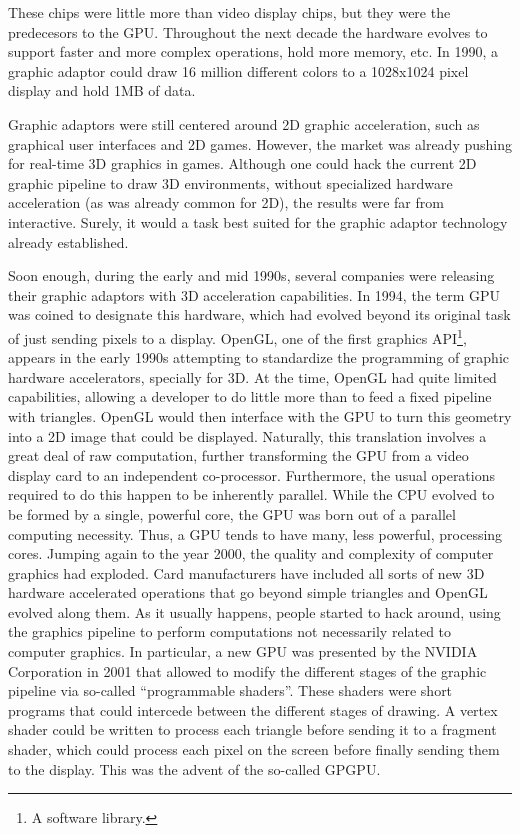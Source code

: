 \documentclass[ twoside,openright,titlepage,numbers=noenddot,%
headinclude,footinclude,cleardoublepage=empty,abstract=on,
BCOR=5mm,paper=a4,fontsize=11pt, dvipsnames
]{scrreprt}
\newcommand{\gpu}{\gls{GPU}\xspace}
\begin{document}
These chips were little more than video display chips, but they were the predecesors to the \gpu.
Throughout the next decade the hardware evolves to support faster and more complex operations, hold more memory, etc. In 1990, a graphic adaptor could draw 16 million different colors to a 1028x1024 pixel display and hold 1MB of data.

Graphic adaptors were still centered around 2D graphic acceleration, such as graphical user interfaces and 2D games. However, the market was already pushing for real-time 3D graphics in games. Although one could hack the current 2D graphic pipeline to draw 3D environments, without specialized hardware acceleration (as was already common for 2D), the results were far from interactive. Surely, it would a task best suited for the graphic adaptor technology already established.

Soon enough, during the early and mid 1990s, several companies were releasing their graphic adaptors with 3D acceleration capabilities. In 1994, the term \gpu was coined to designate this hardware, which had evolved beyond its original task of just sending pixels to a display.
OpenGL\cite{opengl}, one of the first graphics \gls{API}\footnote{A software library.}, appears in the early 1990s attempting to standardize the programming of graphic hardware accelerators, specially for 3D.
At the time, OpenGL had quite limited capabilities, allowing a developer to do little more than to feed a fixed pipeline with triangles. OpenGL would then interface with the \gpu to turn this geometry into a 2D image that could be displayed.
Naturally, this translation involves a great deal of raw computation, further transforming the \gpu from a video display card to an independent co-processor. Furthermore,  the usual operations required to do this happen to be inherently parallel. While the CPU evolved to be formed by a single, powerful core, the \gpu was born out of a parallel computing necessity. Thus, a \gpu tends to have many, less powerful, processing cores.
Jumping again to the year 2000, the quality and complexity of computer graphics had exploded. Card manufacturers have included all sorts of new 3D hardware accelerated operations that go beyond simple triangles and OpenGL evolved along them. As it usually happens, people started to hack around, using the graphics pipeline to perform computations not necessarily related to computer graphics. In particular, a new \gpu was presented by the NVIDIA Corporation in 2001 that allowed to modify the different stages of the graphic pipeline via so-called ``programmable shaders''. These shaders were short programs that could intercede between the different stages of drawing. A vertex shader could be written to process each triangle before sending it to a fragment shader, which could process each pixel on the screen before finally sending them to the display. This was the advent of the so-called \gls{GPGPU}.
\end{document}
